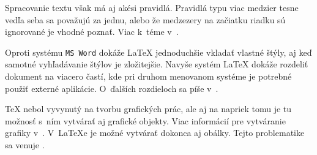 \documentclass[a4paper, 11pt]{article}
\begin{document}
Spracovanie textu však má aj akési pravidlá. Pravidlá typu viac medzier tesne vedľa seba sa považujú za jednu, alebo že medzezery na začiatku riadku sú ignorované je vhodné poznať. Viac k~téme v~\cite{OlsakPetr}. 

Oproti systému \texttt{MS Word} dokáže {\LaTeX} jednoduchšie vkladať vlastné štýly, aj keď samotné vyhľadávanie štýlov je zložitejšie. Navyše systém {\LaTeX} dokáže rozdeliť dokument na viacero častí, kde pri druhom menovanom systéme je potrebné použiť externé aplikácie. O~ďalších rozdieloch sa píše v~\cite{VavreckovaSarka}. 

{\TeX} nebol vyvynutý na tvorbu grafických prác, ale aj na napriek tomu je tu možnosť s~ním vytvárať aj grafické objekty. Viac informácií pre vytváranie grafiky v~\cite{SunolFrancesc}.
V~{\LaTeX}e je možné vytvárať dokonca aj obálky. Tejto problematike sa venuje \cite{MerciadriLuca}.  

\newpage

\renewcommand{\refname}{Literatúra}

\end{document}
